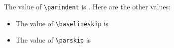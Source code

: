 \documentclass{article}
\begin{document}
	
	\blindtext[1]\par %
	\blindtext[1]
	
	The value of \verb|\parindent| is \texttt{\the\parindent}. Here are the other values:
	
	\begin{itemize}
		\item The value of \verb|\baselineskip| is \texttt{\the\baselineskip}
		\item The value of \verb|\parskip| is \texttt{\the\parskip}
	\end{itemize}
\end{document}
